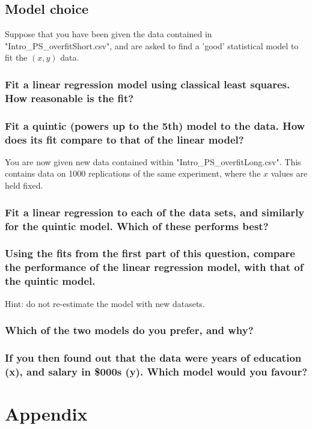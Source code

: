\documentclass[11pt,fullpage]{book}
\begin{document}
\subsection{Model choice}
Suppose that you have been given the data contained in "Intro\_PS\_overfitShort.csv", and are asked to find a 'good' statistical model to fit the $(x,y)$ data.

\subsubsection{Fit a linear regression model using classical least squares. How reasonable is the fit?}
\subsubsection{Fit a quintic (powers up to the 5th) model to the data. How does its fit compare to that of the linear model?}

You are now given new data contained within "Intro\_PS\_overfitLong.csv". This contains data on 1000 replications of the same experiment, where the $x$ values are held fixed.

\subsubsection{Fit a linear regression to each of the data sets, and similarly for the quintic model. Which of these performs best?}

\subsubsection{Using the fits from the first part of this question, compare the performance of the linear regression model, with that of the quintic model.}
Hint: do not re-estimate the model with new datasets.

\subsubsection{Which of the two models do you prefer, and why?}
\subsubsection{If you then found out that the data were years of education (x), and salary in \$000s (y). Which model would you favour?}

\section{Appendix}
\end{document}
